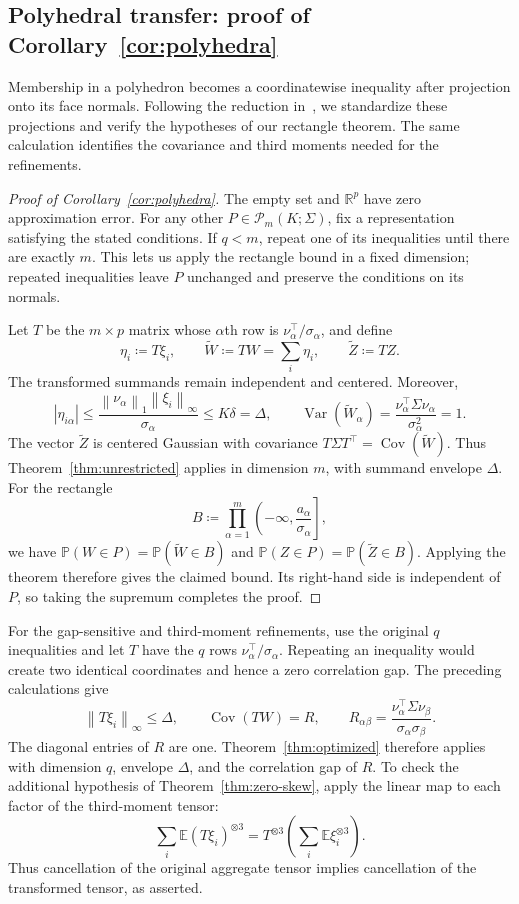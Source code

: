 \documentclass[11pt,letterpaper]{article}
\theoremstyle{remark}
\newcommand{\E}{\mathbb E}
\newcommand{\Pp}{\mathbb P}
\newcommand{\R}{\mathbb R}
\newcommand{\Cov}{\operatorname{Cov}}
\newcommand{\Var}{\operatorname{Var}}
\newcommand{\norm}[1]{\left\lVert#1\right\rVert}
\begin{document}
\subsection{\texorpdfstring{Polyhedral transfer: proof of Corollary~\ref{cor:polyhedra}}{Polyhedral transfer: proof of Corollary 2}}
\label{app:polyhedral-transfer}

Membership in a polyhedron becomes a coordinatewise inequality after
projection onto its face normals. Following the reduction
in~\cite[Section~3.1]{CCK2017}, we standardize these projections and
verify the hypotheses of our rectangle theorem. The same calculation
identifies the covariance and third moments needed for the refinements.

\begin{proof}[Proof of Corollary~\ref{cor:polyhedra}]
The empty set and \(\R^p\) have zero approximation error. For any
other \(P\in\mathcal P_m(K;\Sigma)\), fix a representation satisfying
the stated conditions. If \(q<m\), repeat one of its inequalities
until there are exactly \(m\). This lets us apply the rectangle
bound in a fixed dimension; repeated inequalities leave \(P\)
unchanged and preserve the conditions on its normals.

Let \(T\) be the \(m\times p\) matrix whose \(\alpha\)th row is
\(\nu_\alpha^\top/\sigma_\alpha\), and define
\[
 \eta_i\coloneqq T\xi_i,\qquad
 \widetilde W\coloneqq TW=\sum_i\eta_i,\qquad
 \widetilde Z\coloneqq TZ.
\]
The transformed summands remain independent and centered. Moreover,
\[
 |\eta_{i\alpha}|
 \le\frac{\norm{\nu_\alpha}_1\norm{\xi_i}_\infty}{\sigma_\alpha}
 \le K\delta=\Delta,
 \qquad
 \Var(\widetilde W_\alpha)
 =\frac{\nu_\alpha^\top\Sigma\nu_\alpha}{\sigma_\alpha^2}=1.
\]
The vector \(\widetilde Z\) is centered Gaussian with covariance
\(T\Sigma T^\top=\Cov(\widetilde W)\). Thus
Theorem~\ref{thm:unrestricted} applies in dimension \(m\), with
summand envelope \(\Delta\). For the rectangle
\[
 B\coloneqq\prod_{\alpha=1}^m
 \left(-\infty,\frac{a_\alpha}{\sigma_\alpha}\right],
\]
we have \(\Pp(W\in P)=\Pp(\widetilde W\in B)\) and
\(\Pp(Z\in P)=\Pp(\widetilde Z\in B)\). Applying the theorem
therefore gives the claimed bound. Its right-hand side is independent
of \(P\), so taking the supremum completes the proof.
\end{proof}

For the gap-sensitive and third-moment refinements, use the original
\(q\) inequalities and let \(T\) have the \(q\) rows
\(\nu_\alpha^\top/\sigma_\alpha\). Repeating an inequality would
create two identical coordinates and hence a zero correlation gap.
The preceding calculations give
\[
 \norm{T\xi_i}_\infty\le\Delta,\qquad
 \Cov(TW)=R,\qquad
 R_{\alpha\beta}
 =\frac{\nu_\alpha^\top\Sigma\nu_\beta}
       {\sigma_\alpha\sigma_\beta}.
\]
The diagonal entries of \(R\) are one. Theorem~\ref{thm:optimized}
therefore applies with dimension \(q\), envelope \(\Delta\), and
the correlation gap of \(R\). To check the additional hypothesis
of Theorem~\ref{thm:zero-skew}, apply the linear map to each factor
of the third-moment tensor:
\[
 \sum_i\E(T\xi_i)^{\otimes3}
 =T^{\otimes3}\left(\sum_i\E\xi_i^{\otimes3}\right).
\]
Thus cancellation of the original aggregate tensor implies
cancellation of the transformed tensor, as asserted.
\end{document}
